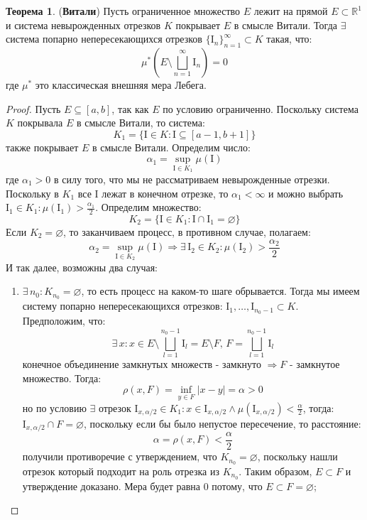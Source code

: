 \documentclass[12pt]{article}
\newcommand{\MR}{\mathbb{R}}
\newcommand{\MI}{\mathrm{I}}
\newcommand{\VN}{\varnothing}
\theoremstyle{definition}
\newtheorem{theorem}{Теорема}
\begin{document}
\begin{theorem}(\textbf{Витали})
	Пусть ограниченное множество $E$ лежит на прямой $E \subset \MR^1$ и система невырожденных отрезков $K$ покрывает $E$ в смысле Витали. Тогда $\exists$ система попарно непересекающихся отрезков $\{\MI_n\}_{n = 1}^{\infty} \subset K$ такая, что:
	$$
		\mu^*\left(E \setminus \bigsqcup\limits_{n = 1}^{\infty}\MI_n\right) = 0
	$$
	где $\mu^*$ это классическая внешняя мера Лебега.
\end{theorem}
\begin{proof}
	Пусть $E \subseteq [a,b]$, так как $E$ по условию ограниченно. Поскольку система $K$ покрывала $E$ в смысле Витали, то система: 
	$$
		K_1 = \{\MI \in K \colon \MI \subseteq [a-1,b+1]\}
	$$ 
	также покрывает $E$ в смысле Витали. Определим число: 
	$$
		\alpha_1 = \sup\limits_{\MI \in K_1}\mu(\MI)
	$$ 
	где $\alpha_1 > 0$ в силу того, что мы не рассматриваем невырожденные отрезки. Поскольку в $K_1$ все $\MI$ лежат в конечном отрезке, то $\alpha_1 < \infty$ и можно выбрать $\MI_1 \in K_1 \colon \mu(\MI_1) > \tfrac{\alpha_1}{2}$. Определим множество: 
	$$
		K_2 = \{\MI \in K_1 \colon \MI \cap \MI_1 = \VN\}
	$$ 
	Если $K_2 = \VN$, то заканчиваем процесс, в противном случае, полагаем:
	$$
		\alpha_2 = \sup\limits_{\MI \in K_2}\mu(\MI) \Rightarrow \exists \, \MI_2 \in K_2 \colon \mu(\MI_2) > \dfrac{\alpha_2}{2}
	$$ 
	И так далее, возможны два случая:
	\begin{enumerate}[label=\arabic*)]
		\item $\exists \, n_0 \colon K_{n_0} = \VN$, то есть процесс на каком-то шаге обрывается. Тогда мы имеем систему попарно непересекающихся отрезков: $\MI_1, \dotsc, \MI_{n_0 -1} \subset K$. Предположим, что: 
		$$
			\exists \, x \colon x \in E \setminus \bigsqcup\limits_{l = 1}^{n_0 - 1}\MI_l = E \setminus F, \, F = \bigsqcup\limits_{l = 1}^{n_0 - 1}\MI_l
		$$
		конечное объединение замкнутых множеств - замкнуто $\Rightarrow F$ - замкнутое множество. Тогда: 
		$$
			\rho(x,F) = \inf\limits_{y \in F} |x -y| = \alpha > 0
		$$
		но по условию $\exists$ отрезок $\MI_{x,\alpha/2} \in K_1 \colon x \in \MI_{x,\alpha/2} \wedge \mu(\MI_{x,\alpha/2}) < \tfrac{\alpha}{2}$, тогда: $\MI_{x,\alpha/2} \cap F = \VN$, поскольку если бы было непустое пересечение, то расстояние: 
		$$
			\alpha = \rho(x,F) < \dfrac{\alpha}{2}
		$$
		получили противоречие с утверждением, что $K_{n_0} = \VN$, поскольку нашли отрезок который подходит на роль отрезка из $K_{n_0}$. Таким образом, $E \subset F$ и утверждение  доказано. Мера будет равна $0$ потому, что $E \subset F = \VN$;

\end{enumerate}
\end{proof}
\end{document}

